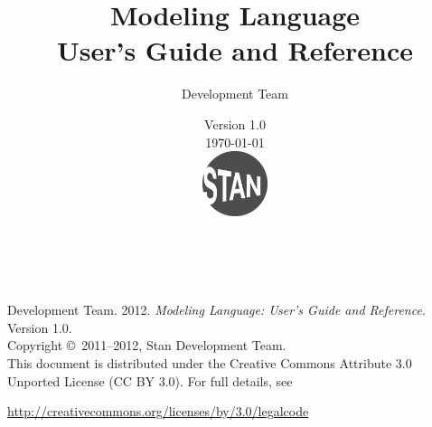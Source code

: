 \title{\Huge\bf \Stan Modeling Language \\[4pt] {\LARGE User's Guide and Reference}}
\author{\Stan Development Team}
\date{\vspace*{36pt} \Stan Version 1.0 \\[4pt] {\small \today}
\\
\vfill
\includegraphics[width=0.75in]{../../../logos/stanlogo-main.pdf}}

\maketitle

\newpage
\thispagestyle{empty}
\mbox{ }
\vfill
\begin{center}
\begin{minipage}[t]{0.75\textwidth}
\small
\Stan Development Team. 2012.  
{\it \Stan Modeling Language: User's Guide and Reference}. Version
1.0.  
\vspace*{20pt}
\mbox{ }
\\
Copyright \copyright \ 2011--2012, Stan Development Team.
\vspace*{28pt}
\mbox{} \\
This document is distributed under the Creative Commons Attribute 3.0
Unported License (CC BY 3.0).  For full details, see
\begin{center}
\url{http://creativecommons.org/licenses/by/3.0/legalcode} 
\end{center}
\end{minipage}
\vspace*{24pt}
\mbox{ }
\end{center}
